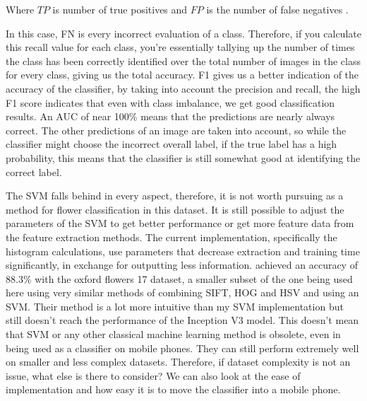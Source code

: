 \documentclass[12pt,a4paper]{report}
\begin{document}
Where \(TP\) is number of true positives and \(FP\) is the number of false negatives \citep{googledevrecall}.

\par

In this case, FN is every incorrect evaluation of a class. Therefore, if you calculate this recall value for each class,
you're essentially tallying up the number of times the class has been correctly identified over the total number of 
images in the class for every class, giving us the total accuracy. F1 gives us a better indication of the accuracy of 
the classifier, by taking into account the precision and recall, the high F1 score indicates that even with class 
imbalance, we get good classification results. An AUC of near 100\% means that the predictions are nearly always 
correct. The other predictions of an image are taken into account, so while the classifier might choose the incorrect 
overall label, if the true label has a high probability, this means that the classifier is still somewhat good at 
identifying the correct label.

\par

The SVM falls behind in every aspect, therefore, it is not worth pursuing as a method for flower classification in this 
dataset. It is still possible to adjust the parameters of the SVM to get better performance or get more feature data 
from the feature extraction methods. The current implementation, specifically the histogram calculations, use parameters
that decrease extraction and training time significantly, in exchange for outputting less information. 
\citet{Nilsback2008}
achieved an accuracy of 88.3\% with the oxford flowers 17 dataset, a smaller subset of the one being used here using 
very similar methods of combining SIFT, HOG and HSV and using an SVM. Their method is a lot more intuitive than my SVM 
implementation but still doesn't reach the performance of the Inception V3 model. This doesn't mean that SVM or any 
other classical machine learning method is obsolete, even in being used as a classifier on mobile phones. They can still
perform extremely well on smaller and less complex datasets. Therefore, if dataset complexity is not an issue, what 
else is there to consider? We can also look at the ease of implementation and how easy it is to move the classifier 
into a mobile phone.
\end{document}
